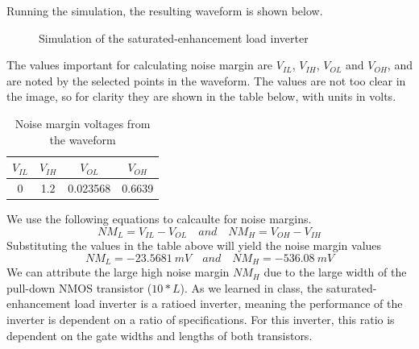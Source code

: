 \documentclass[12pt]{article}
\begin{document}
\pagebreak
Running the simulation, the resulting waveform is shown below.
\begin{figure} [H]
    \centering
    \caption{Simulation of the saturated-enhancement load inverter}
\end{figure}
The values important for calculating noise margin are $V_{IL}$, $V_{IH}$, $V_{OL}$ and $V_{OH}$, and are noted by the selected points in the waveform.
The values are not too clear in the image, so for clarity they are shown in the table below, with units in volts.
\begin{table} [H]
    \centering
    \begin{tabular} {cccc} 
        $V_{IL}$ & $V_{IH}$ & $V_{OL}$ & $V_{OH}$\\
        \hline
        0 & 1.2 & 0.023568 & 0.6639
    \end{tabular}
    \caption{Noise margin voltages from the waveform}
\end{table}
We use the following equations to calcaulte for noise margins.
\[NM_L = V_{IL} - V_{OL} \quad and \quad NM_H = V_{OH} - V_{IH}\]
Substituting the values in the table above will yield the noise margin values
\[NM_L = \SI{-23.5681}{mV} \quad and \quad NM_H = \SI{-536.08}{mV}\]
We can attribute the large high noise margin $NM_H$ due to the large width of the pull-down NMOS transistor ($10*L$). As we learned in class, the 
saturated-enhancement load inverter is a ratioed inverter, meaning the performance of the inverter is dependent on a ratio of specifications.
For this inverter, this ratio is dependent on the gate widths and lengths of both transistors.
\end{document}
